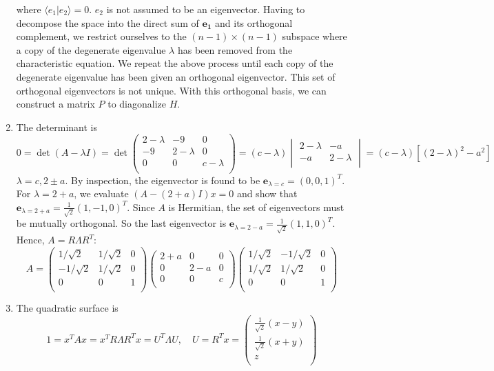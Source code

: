 \documentclass[a4paper]{article}
\begin{document}
\begin{ans}
\begin{enumerate}[label=(\alph*)]
where $\langle e_1|e_2\rangle=0$. $e_2$ is not assumed to be an eigenvector. Having to decompose the space into the direct sum of $\mathbf{e_1}$ and its orthogonal complement, we restrict ourselves to the $(n-1)\times(n-1)$ subspace where a copy of the degenerate eigenvalue $\lambda$ has been removed from the characteristic equation. We repeat the above process until each copy of the degenerate eigenvalue has been given an orthogonal eigenvector. This set of orthogonal eigenvectors is not unique. With this orthogonal basis, we can construct a matrix $P$ to diagonalize $H$.
\item The determinant is
$$0=\det(A-\lambda I)=\det\begin{pmatrix}2-\lambda&-9&0\\-9&2-\lambda&0\\0&0&c-\lambda\\\end{pmatrix}=(c-\lambda)\begin{vmatrix}2-\lambda&-a\\-a&2-\lambda\\\end{vmatrix}=(c-\lambda)[(2-\lambda)^2-a^2]$$
$\lambda=c,2\pm a$. By inspection, the eigenvector is found to be $\mathbf{e}_{\lambda=c}=(0,0,1)^T$. For $\lambda=2+a$, we evaluate $(A-(2+a)I)x=0$ and show that $\mathbf{e}_{\lambda=2+a}=\frac{1}{\sqrt{2}}(1,-1,0)^T$. Since $A$ is Hermitian, the set of eigenvectors must be mutually orthogonal. So the last eigenvector is $\mathbf{e}_{\lambda=2-a}=\frac{1}{\sqrt{2}}(1,1,0)^T$. Hence, $A=R\Lambda R^T$:
$$A=\begin{pmatrix}1/\sqrt{2}&1/\sqrt{2}&0\\-1/\sqrt{2}&1/\sqrt{2}&0\\0&0&1\\\end{pmatrix}\begin{pmatrix}2+a&0&0\\0&2-a&0\\0&0&c\\\end{pmatrix}\begin{pmatrix}1/\sqrt{2}&-1/\sqrt{2}&0\\1/\sqrt{2}&1/\sqrt{2}&0\\0&0&1\\\end{pmatrix}$$
\item The quadratic surface is 
$$1=x^TAx=x^TR\Lambda R^Tx=U^T\Lambda U,\quad U=R^Tx=\begin{pmatrix}\frac{1}{\sqrt{2}}(x-y)\\\frac{1}{\sqrt{2}}(x+y)\\z\\\end{pmatrix}$$

\end{enumerate}
\end{ans}
\end{document}
